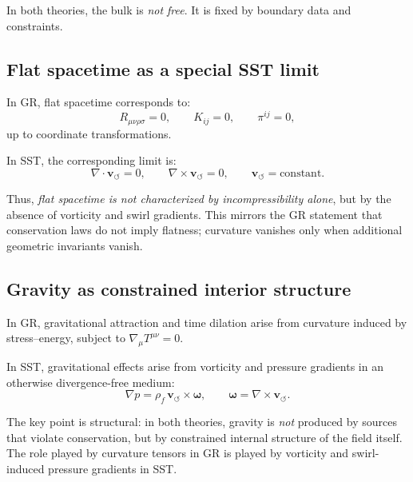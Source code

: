 \documentclass[11pt]{article}
\begin{document}
        In both theories, the bulk is \emph{not free}. It is fixed by boundary data and
        constraints.

    \subsection{Flat spacetime as a special SST limit}

        In GR, flat spacetime corresponds to:
        \[
            R_{\mu\nu\rho\sigma} = 0,
            \qquad
            K_{ij} = 0,
            \qquad
            \pi^{ij} = 0,
        \]
        up to coordinate transformations.

        In SST, the corresponding limit is:
        \[
            \nabla\cdot \mathbf{v}_{\!\boldsymbol{\circlearrowleft}} = 0,
            \qquad
            \nabla\times \mathbf{v}_{\!\boldsymbol{\circlearrowleft}} = 0,
            \qquad
            \mathbf{v}_{\!\boldsymbol{\circlearrowleft}} = \text{constant}.
        \]

        Thus, \emph{flat spacetime is not characterized by incompressibility alone}, but
        by the absence of vorticity and swirl gradients. This mirrors the GR statement
        that conservation laws do not imply flatness; curvature vanishes only when
        additional geometric invariants vanish.

    \subsection{Gravity as constrained interior structure}

        In GR, gravitational attraction and time dilation arise from curvature induced by
        stress--energy, subject to $\nabla_\mu T^{\mu\nu}=0$.

        In SST, gravitational effects arise from vorticity and pressure gradients in an
        otherwise divergence-free medium:
        \begin{equation}
            \nabla p = \rho_{\!f}\,\mathbf{v}_{\!\boldsymbol{\circlearrowleft}}
            \times \boldsymbol{\omega},
            \qquad
            \boldsymbol{\omega} = \nabla\times\mathbf{v}_{\!\boldsymbol{\circlearrowleft}}.
        \end{equation}

        The key point is structural: in both theories, gravity is \emph{not} produced by
        sources that violate conservation, but by constrained internal structure of the
        field itself. The role played by curvature tensors in GR is played by vorticity
        and swirl-induced pressure gradients in SST.
\end{document}
